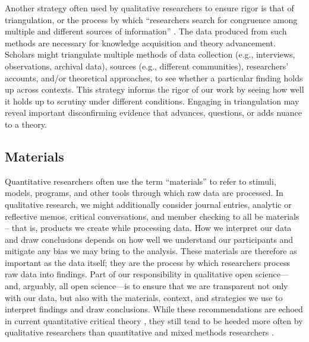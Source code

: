 \documentclass[authordate, meta, issue]{jote-new-article}
\begin{document}
Another strategy often used by qualitative researchers to ensure rigor is that of triangulation, or the process by which “researchers search for congruence among multiple and different sources of information” \parencites[page 126]{Creswell2000}. The data produced from such methods are necessary for knowledge acquisition and theory advancement. Scholars might triangulate multiple methods of data collection (e.g., interviews, observations, archival data), sources (e.g., different communities), researchers’ accounts, and/or theoretical approaches, to see whether a particular finding holds up across contexts. This strategy informs the rigor of our work by seeing how well it holds up to scrutiny under different conditions. Engaging in triangulation may reveal important disconfirming evidence that advances, questions, or adds nuance to a theory.







\subsection{Materials }



Quantitative researchers often use the term “materials” to refer to stimuli, models, programs, and other tools through which raw data are processed. In qualitative research, we might additionally consider journal entries, analytic or reflective memos, critical conversations, and member checking to all be materials – that is, products we create while processing data. How we interpret our data and draw conclusions depends on how well we understand our participants and mitigate any bias we may bring to the analysis. These materials are therefore as important as the data itself; they are the process by which researchers process raw data into findings. Part of our responsibility in qualitative open science—and, arguably, all open science—is to ensure that we are transparent not only with our data, but also with the materials, context, and strategies we use to interpret findings and draw conclusions. While these recommendations are echoed in current quantitative critical theory \parencites[QuantCrit; e.g.,][]{Gillborn2018}, they still tend to be heeded more often by qualitative researchers than quantitative and mixed methods researchers \parencites{Hope2019}.
\end{document}
